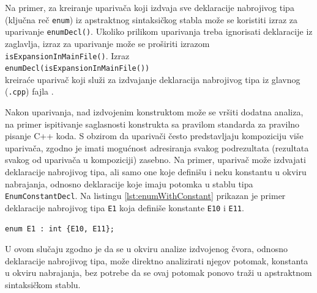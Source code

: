 \documentclass[12pt,oneside]{memoir}
\begin{document}
\par
Na primer, za kreiranje upariva\v{c}a koji izdvaja sve deklaracije nabrojivog tipa (klju\v{c}na re\v{c} \texttt{enum}) iz apstraktnog sintaksi\v{c}kog stabla mo\v{z}e se koristiti izraz za uparivanje \texttt{enumDecl()}. Ukoliko prilikom uparivanja treba ignorisati deklaracije iz zaglavlja, izraz za uparivanje mo\v{z}e se pro\v{s}iriti izrazom \texttt{isExpansionIn\-MainFile()}. Izraz \\ \texttt{enumDecl(isExpansionInMainFile())} \\ kreira\'{c}e upariva\v{c} koji slu\v{z}i za izdvajanje deklaracija nabrojivog tipa iz glavnog (\texttt{.cpp}) fajla \cite{ASTMatcherReference, MatchingClangAST}.

Nakon uparivanja, nad izdvojenim konstruktom mo\v{z}e se vr\v{s}iti dodatna analiza, na primer ispitivanje saglasnosti konstrukta sa pravilom standarda za pravilno pisanje C++ koda.
S obzirom da upariva\v{c}i \v{c}esto predstavljaju kompoziciju vi\v{s}e upariva\v{c}a, zgodno je imati mogu\'{c}nost adresiranja svakog podrezultata (rezultata svakog od upariva\v{c}a u kompoziciji) zasebno. Na primer, upariva\v{c} mo\v{z}e izdvajati deklaracije nabrojivog tipa, ali samo one koje defini\v{s}u i neku konstantu u okviru nabrajanja, odnosno deklaracije koje imaju potomka u stablu tipa \texttt{EnumConstantDecl}. Na listingu \ref{lst:enumWithConstant} prikazan je primer deklaracije nabrojivog tipa \texttt{E1} koja defini\v{s}e konstante \texttt{E10} i \texttt{E11}. 
\begin{lstlisting}[style=customc,  caption={Primer deklaracije nabrojivog tipa (\texttt{E1}) koja defini\v{s}e konstante u okviru nabrajanja (\texttt{E10} i \texttt{E11}).}, label=lst:enumWithConstant]
enum E1 : int {E10, E11};
\end{lstlisting}
U ovom slu\v{c}aju
zgodno je da se u okviru analize izdvojenog \v{c}vora, odnosno deklaracije nabrojivog tipa, mo\v{z}e direktno analizirati njegov potomak, konstanta u okviru nabrajanja, bez potrebe da se ovaj potomak ponovo tra\v{z}i u apstraktnom sintaksi\v{c}kom stablu.
\end{document}
